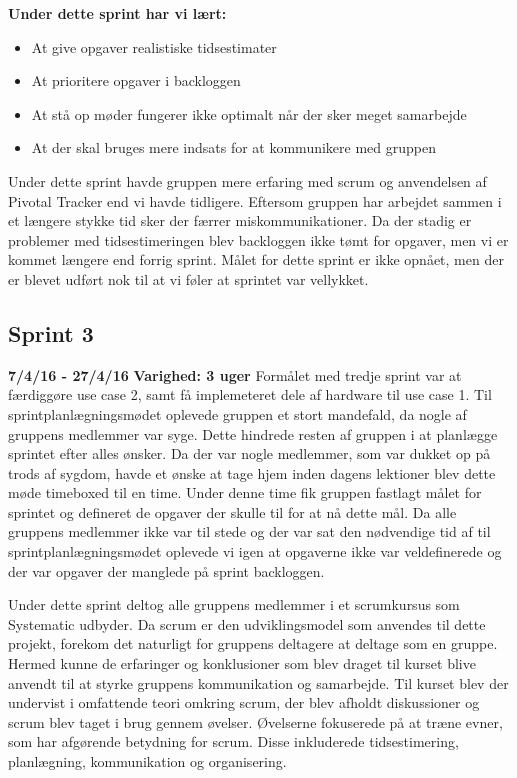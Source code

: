 	\textbf{Under dette sprint har vi lært:}
	\begin{itemize}
		\item At give opgaver realistiske tidsestimater
		\item At prioritere opgaver i backloggen
		\item At stå op møder fungerer ikke optimalt når der sker meget samarbejde
		\item At der skal bruges mere indsats for at kommunikere med gruppen 
	\end{itemize}
	
	Under dette sprint havde gruppen mere erfaring med scrum og anvendelsen af Pivotal Tracker end vi havde tidligere. Eftersom gruppen har arbejdet sammen i et længere stykke tid sker der færrer miskommunikationer. Da der stadig er problemer med tidsestimeringen blev backloggen ikke tømt for opgaver, men vi er kommet længere end forrig sprint. Målet for dette sprint er ikke opnået, men der er blevet udført nok til at vi føler at sprintet var vellykket.
	
	\subsection{Sprint 3}
	\textbf{7/4/16 - 27/4/16}\newline
	\textbf{Varighed: 3 uger} \newline
	Formålet med tredje sprint var at færdiggøre use case 2, samt få implemeteret dele af hardware til use case 1. Til sprintplanlægningsmødet oplevede gruppen et stort mandefald, da nogle af gruppens medlemmer var syge. Dette hindrede resten af gruppen i at planlægge sprintet efter alles ønsker. Da der var nogle medlemmer, som var dukket op på trods af sygdom, havde et ønske at tage hjem inden dagens lektioner blev dette møde timeboxed til en time. Under denne time fik gruppen fastlagt målet for sprintet og defineret de opgaver der skulle til for at nå dette mål. Da alle gruppens medlemmer ikke var til stede og der var sat den nødvendige tid af til sprintplanlægningsmødet oplevede vi igen at opgaverne ikke var veldefinerede og der var opgaver der manglede på sprint backloggen. \newline
	
	Under dette sprint deltog alle gruppens medlemmer i et scrumkursus som Systematic udbyder. Da scrum er den udviklingsmodel som anvendes til dette projekt, forekom det naturligt for gruppens deltagere at deltage som en gruppe. Hermed kunne de erfaringer og konklusioner som blev draget til kurset blive anvendt til at styrke gruppens kommunikation og samarbejde. 
	Til kurset blev der undervist i omfattende teori omkring scrum, der blev afholdt diskussioner og scrum blev taget i brug gennem øvelser. Øvelserne fokuserede på at træne evner, som har afgørende betydning for scrum. Disse inkluderede tidsestimering, planlægning, kommunikation og organisering. \newline
	
